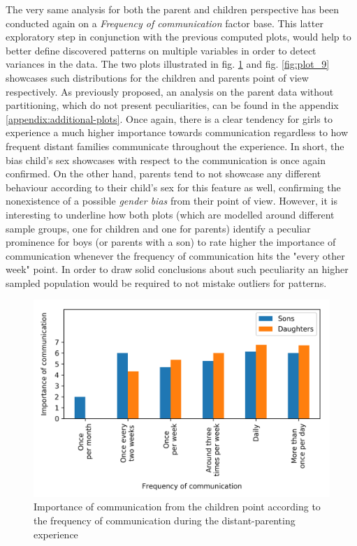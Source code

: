 The very same analysis for both the parent and children perspective has been conducted again on a \textit{Frequency of communication} factor base. This latter exploratory step in conjunction with the previous computed plots, would help to better define discovered patterns on multiple variables in order to detect variances in the data. The two plots illustrated in fig. \ref{fig:plot_10} and fig. \ref{fig:plot_9} showcases such distributions for the children and parents point of view respectively. As previously proposed, an analysis on the parent data without partitioning, which do not present peculiarities, can be found in the appendix \ref{appendix:additional-plots}. Once again, there is a clear tendency for girls to experience a much higher importance towards communication regardless to how frequent distant families communicate throughout the experience. In short, the bias child's sex showcases with respect to the communication is once again confirmed.  On the other hand, parents tend to not showcase any different behaviour according to their child's sex for this feature as well, confirming the nonexistence of a possible \textit{gender bias} from their point of view. However, it is interesting to underline how both plots (which are modelled around different sample groups, one for children and one for parents) identify a peculiar prominence for boys (or parents with a son) to rate higher the importance of communication whenever the frequency of communication hits the "every other week" point. In order to draw solid conclusions about such peculiarity an higher sampled population would be required to not mistake outliers for patterns.  

\begin{figure}[h]
    \centering
    \caption{Importance of communication from the children point according to the frequency of communication during the distant-parenting experience}
    \label{fig:plot_10}
    \includegraphics[scale=0.58]{plots/plot_10.png}
\end{figure}

